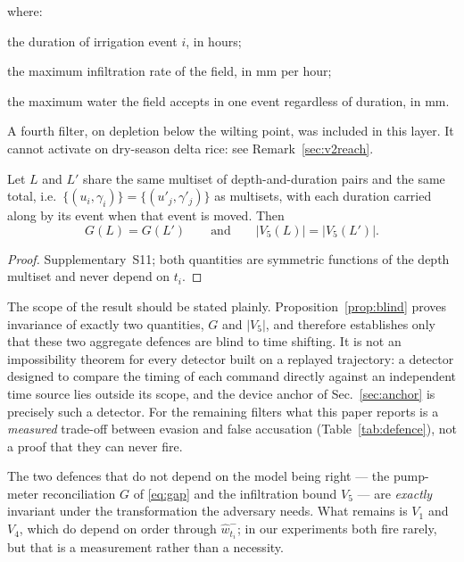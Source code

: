 where:
\begin{symbolist}
\item[$\gamma_i$] the duration of irrigation event $i$, in hours;
\item[$k_{\mathrm{inf}}$] the maximum infiltration rate of the field, in mm per hour;
\item[$p_{\max}$] the maximum water the field accepts in one event regardless of
    duration, in mm.
\end{symbolist}

A fourth filter, on depletion below the wilting point, was included in this layer. It cannot activate on dry-season delta rice: see Remark~\ref{sec:v2reach}.

\begin{proposition}
\label{prop:blind}
Let $L$ and $L'$ share the same multiset of depth-and-duration pairs and the same
total, i.e.\ $\{(u_i,\gamma_i)\}=\{(u'_j,\gamma'_j)\}$ as multisets, with each
duration carried along by its event when that event is moved. Then
\begin{equation}
G(L)=G(L')\qquad\text{and}\qquad |V_5(L)|=|V_5(L')|.
\end{equation}
\end{proposition}

\begin{proof}
Supplementary~S11; both quantities are symmetric functions of the depth
multiset and never depend on $t_i$.
\end{proof}

The scope of the result should be stated plainly. Proposition~\ref{prop:blind}
proves invariance of exactly two quantities, $G$ and $|V_5|$, and therefore establishes
only that these two aggregate defences are blind to time shifting. It is not an
impossibility theorem for every detector built on a replayed trajectory: a detector
designed to compare the timing of each command directly against an independent time
source lies outside its scope, and the device anchor of Sec.~\ref{sec:anchor} is
precisely such a detector. For the remaining filters what this paper reports is a
\emph{measured} trade-off between evasion and false accusation
(Table~\ref{tab:defence}), not a proof that they can never fire.

The two defences that do not depend on the model being right --- the pump-meter
reconciliation $G$ of \eqref{eq:gap} and the infiltration bound $V_5$ --- are
\emph{exactly} invariant under the transformation the adversary needs. What remains is
$V_1$ and $V_4$, which do depend on order through $\hat w_{t_i}^{-}$; in our
experiments both fire rarely, but that is a measurement rather than a necessity.

